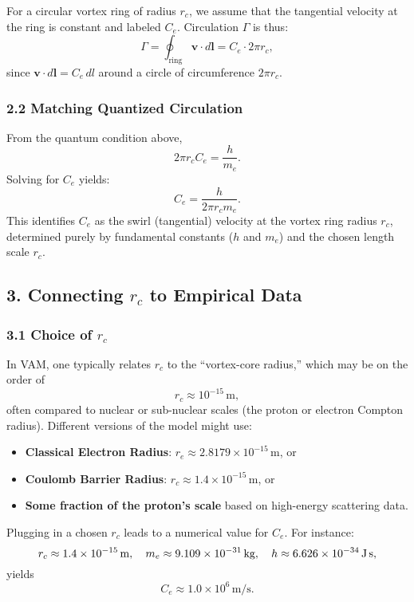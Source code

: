 For a circular vortex ring of radius \(r_c\), we assume that the tangential velocity at the ring is constant and labeled \(C_e\). Circulation \(\Gamma\) is thus:
\[
    \Gamma = \oint_\text{ring} \mathbf{v} \cdot d\mathbf{l} = C_e \cdot 2 \pi r_c,
\]
since \(\mathbf{v} \cdot d\mathbf{l} = C_e \,dl\) around a circle of circumference \(2\pi r_c\).

\subsubsection*{2.2 Matching Quantized Circulation}

From the quantum condition above,
\[
    2 \pi r_c C_e = \frac{h}{m_e}.
\]
Solving for \(C_e\) yields:
\[
    C_e = \frac{h}{2 \pi r_c m_e}.
\]
This identifies \(C_e\) as the swirl (tangential) velocity at the vortex ring radius \(r_c\), determined purely by fundamental constants (\(h\) and \(m_e\)) and the chosen length scale \(r_c\).

\subsection*{3. Connecting \(r_c\) to Empirical Data}

\subsubsection*{3.1 Choice of \(r_c\)}

In VAM, one typically relates \(r_c\) to the “vortex-core radius,” which may be on the order of
\[
    r_c \approx 10^{-15}\,\text{m},
\]
often compared to nuclear or sub-nuclear scales (the proton or electron Compton radius). Different versions of the model might use:
\begin{itemize}
    \item \textbf{Classical Electron Radius}: \(r_e \approx 2.8179 \times 10^{-15}\,\mathrm{m}\), or
    \item \textbf{Coulomb Barrier Radius}: \(r_c \approx 1.4 \times 10^{-15}\,\mathrm{m}\), or
    \item \textbf{Some fraction of the proton’s scale} based on high-energy scattering data.
\end{itemize}

Plugging in a chosen \(r_c\) leads to a numerical value for \(C_e\). For instance:
\[
    r_c \approx 1.4 \times 10^{-15}\,\text{m}, \quad m_e \approx 9.109 \times 10^{-31}\,\text{kg}, \quad h \approx 6.626 \times 10^{-34}\,\text{J\,s},
\]
yields
\[
    C_e \approx 1.0 \times 10^6 \,\text{m/s}.
\]

